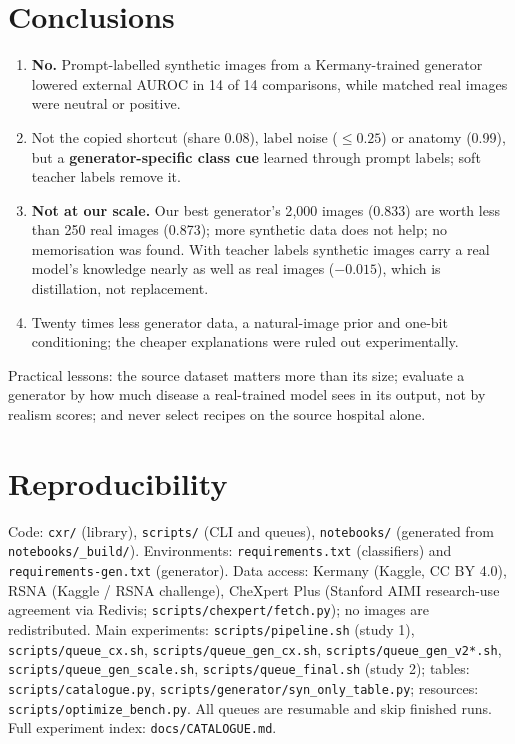 \documentclass[11pt,a4paper]{article}
\newcommand{\code}[1]{\texttt{\small #1}}
\begin{document}
\section{Conclusions}
\begin{enumerate}
\item[RQ1] \textbf{No.} Prompt-labelled synthetic images from a Kermany-trained generator lowered external AUROC in 14 of 14 comparisons, while matched real images were neutral or positive.
\item[RQ2] Not the copied shortcut (share 0.08), label noise ($\le0.25$) or anatomy (0.99), but a \textbf{generator-specific class cue} learned through prompt labels; soft teacher labels remove it.
\item[RQ3] \textbf{Not at our scale.} Our best generator's 2{,}000 images (0.833) are worth less than 250 real images (0.873); more synthetic data does not help; no memorisation was found. With teacher labels synthetic images carry a real model's knowledge nearly as well as real images ($-0.015$), which is distillation, not replacement.
\item[RQ4] Twenty times less generator data, a natural-image prior and one-bit conditioning; the cheaper explanations were ruled out experimentally.
\end{enumerate}
Practical lessons: the source dataset matters more than its size; evaluate a generator by how much disease a real-trained model sees in its output, not by realism scores; and never select recipes on the source hospital alone.

\section{Reproducibility}
Code: \code{cxr/\allowbreak{}} (library), \code{scripts/\allowbreak{}} (CLI and queues), \code{notebooks/\allowbreak{}} (generated from \code{notebooks/\allowbreak{}\_\allowbreak{}build/\allowbreak{}}). Environments: \code{requirements.txt} (classifiers) and \code{requirements-gen.txt} (generator). Data access: Kermany (Kaggle, CC BY 4.0), RSNA (Kaggle / RSNA challenge), CheXpert Plus (Stanford AIMI research-use agreement via Redivis; \code{scripts/\allowbreak{}chexpert/\allowbreak{}fetch.py}); no images are redistributed. Main experiments: \code{scripts/\allowbreak{}pipeline.sh} (study 1), \code{scripts/\allowbreak{}queue\_\allowbreak{}cx.sh}, \code{scripts/\allowbreak{}queue\_\allowbreak{}gen\_\allowbreak{}cx.sh}, \code{scripts/\allowbreak{}queue\_\allowbreak{}gen\_\allowbreak{}v2*.sh}, \code{scripts/\allowbreak{}queue\_\allowbreak{}gen\_\allowbreak{}scale.sh}, \code{scripts/\allowbreak{}queue\_\allowbreak{}final.sh} (study 2); tables: \code{scripts/\allowbreak{}catalogue.py}, \code{scripts/\allowbreak{}generator/\allowbreak{}syn\_\allowbreak{}only\_\allowbreak{}table.py}; resources: \code{scripts/\allowbreak{}optimize\_\allowbreak{}bench.py}. All queues are resumable and skip finished runs. Full experiment index: \code{docs/\allowbreak{}CATALOGUE.md}.
\end{document}
